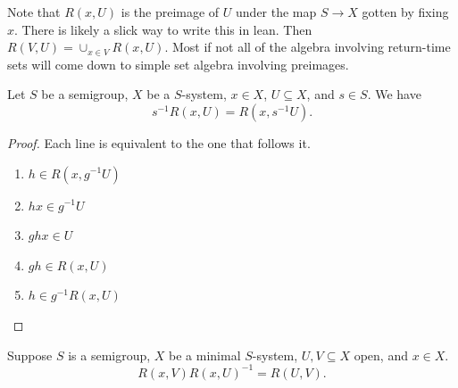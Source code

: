 \begin{leanrmk}
    Note that $R(x,U)$ is the preimage of $U$ under the map $S \to X$ gotten by fixing $x$.  There is likely a slick way to write this in lean.  Then $R(V,U) = \cup_{x \in V} R(x,U)$.  Most if not all of the algebra involving return-time sets will come down to simple set algebra involving preimages.
\end{leanrmk}

\begin{lemma}
\label{lemma_return_time_algebra_one}
\leanok{}
    Let $S$ be a semigroup, $X$ be a $S$-system, $x \in X$, $U \subseteq X$, and $s \in S$. We have
    \[s^{-1}R(x,U) = R(x,s^{-1}U).\]
\end{lemma}

\begin{proof}
\leanok{}
    Each line is equivalent to the one that follows it.
    \begin{enumerate}
        \item $h \in R(x,g^{-1}U)$
        \item $hx \in g^{-1}U$
        \item $ghx \in U$
        \item $gh \in R(x,U)$
        \item $h \in g^{-1} R(x,U)$
    \end{enumerate}
\end{proof}



\begin{lemma}
\label{lemma_return_time_algebra_three}
\leanok{}
    Suppose $S$ is a semigroup, $X$ be a minimal $S$-system, $U, V \subseteq X$ open, and $x \in X$.
    \[R(x,V)R(x,U)^{-1} = R(U,V).\]
\end{lemma}

